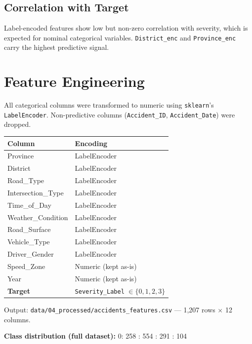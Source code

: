 \documentclass[12pt,a4paper]{article}
\begin{document}
\subsection{Correlation with Target}
Label-encoded features show low but non-zero correlation with severity, which is expected for nominal categorical variables. \texttt{District\_enc} and \texttt{Province\_enc} carry the highest predictive signal.

\section{Feature Engineering}

All categorical columns were transformed to numeric using \texttt{sklearn}'s \texttt{LabelEncoder}. Non-predictive columns (\texttt{Accident\_ID}, \texttt{Accident\_Date}) were dropped.

\begin{center}
\begin{tabular}{ll}
\toprule
\textbf{Column} & \textbf{Encoding} \\
\midrule
Province           & LabelEncoder \\
District           & LabelEncoder \\
Road\_Type         & LabelEncoder \\
Intersection\_Type & LabelEncoder \\
Time\_of\_Day      & LabelEncoder \\
Weather\_Condition & LabelEncoder \\
Road\_Surface      & LabelEncoder \\
Vehicle\_Type      & LabelEncoder \\
Driver\_Gender     & LabelEncoder \\
Speed\_Zone        & Numeric (kept as-is) \\
Year               & Numeric (kept as-is) \\
\midrule
\textbf{Target}    & \texttt{Severity\_Label} $\in \{0,1,2,3\}$ \\
\bottomrule
\end{tabular}
\end{center}

Output: \texttt{data/04\_processed/accidents\_features.csv} — 1,207 rows $\times$ 12 columns.

\textbf{Class distribution (full dataset):}
0: 258 : 554 : 291 : 104
\end{document}
